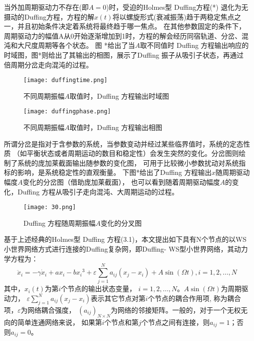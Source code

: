 当外加周期驱动力不存在(即$A=0$)时，受迫的Holmes型 Duffing方程(*)
退化为无摄动的Duffing方程，方程的解$x\left(t\right)$将以螺旋形式(衰减振荡)趋于两稳定焦点之一，并且初始条件决定着系统将最终趋于哪一焦点。
在其他参数固定的条件下，周期驱动力的幅值A从0开始逐渐增加到1时，方程的解会经历同宿轨道、分岔、混沌和大尺度周期等各个状态。
图 *给出了当$A$取不同值时 Duffing 方程输出响应的时域图，图*则给出了其输出的相图，展示了Duffing 振子从吸引子状态，再通过倍周期分岔走向混沌的过程。
 \begin{figure}[!htbp]
    \centering
    \texttt{[image: duffingtime.png]}
    \caption{不同周期振幅$A$取值时，Duffing 方程输出时域图}
 \end{figure}

 \begin{figure}[!htbp]
    \centering
    \texttt{[image: duffingphase.png]}
    \caption{不同周期振幅$A$取值时，Duffing 方程输出相图}
 \end{figure}

所谓分岔是指对于含参数的系统，当参数变动并经过某些临界值时，系统的定态性质
（如平衡状态或者周期运动的数目和稳定性）会发生突然的变化。分岔图则绘制了系统的庞加莱截面输出随参数的变化图，
可用于比较微小参数扰动对系统指标的影响，是系统稳定性的直观衡量。 下图*给出了Duffing 方程输出$x$随周期驱动幅度$A$变化的分岔图（借助庞加莱截面），
也可以看到随着周期驱动幅度$A$的变化，Duffing 方程从吸引子走向混沌、大周期运动的过程。
 \begin{figure}[!htbp]
    \centering
    \texttt{[image: 30.png]}\caption{Duffing 方程随周期振幅$A$变化的分叉图}
 \end{figure}


基于上述经典的Holmes型 Duffing 方程(3.1)，本文提出如下具有N个节点的以WS小世界网络方式进行连接的Duffing复杂网，即Duffing- WS型小世界网络，其动力学方程为：
\begin{equation}
    \ddot{x}_{i}=-\gamma \dot{x}_{i}+a x_{i}-b x_{i}{ }^{3}+\varepsilon \sum_{j=1}^{N} a_{i j}\left(x_{j}-x_{i}\right)+A \sin (\Omega t), i=1,2, \ldots, N
\end{equation}
其中，$x_i(t)$为第$i$个节点的输出状态变量， $i=1,2,\ldots,N$。$A\sin(\Omega t)$为周期驱动力， 
$\varepsilon \sum_{j=1}^{N} a_{i j}\left(x_{j}-x_{i}\right)$表示其它节点对第$i$个节点的耦合作用项, 称为耦合项，$\varepsilon$为网络耦合强度，
$\left(a_{ij}\right)_{N\times N}$为网络的邻接矩阵。一般的，对于一个无权无向的简单连通网络来说，
如果第$i$个节点和第$j$个节点之间有连接，则$a_{ij} = 1$；否则$a_{ij} = 0$。


